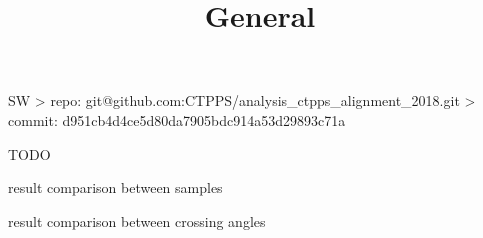 


\newpage %

\def\author{J.~Kašpar}
\def\caption{CTPPS alignment 2018}
\def\date{\the\year/\the\month/\the\day}

\let\NormalFonts\SetFontSizesX

\newpage %
\title{General}

\> SW
\>> repo: git@github.com:CTPPS/analysis\_ctpps\_alignment\_2018.git
\>> commit: d951cb4d4ce5d80da7905bdc914a53d29893c71a

\> TODO
\iffalse
\> input data
\>> alignment runs:\\ /eos/totem/data/ctpps/reconstruction/2017/alignment\_run\_September/version7
\>> physics runs:\\ /eos/totem/data/ctpps/reconstruction/2017/postTS2\_alignment\_data/version5
\>>> from Run2017E-17Nov2017-v1/AOD and Run2017F-17Nov2017-v1/AOD

\> re-reco performed with\\
/afs/cern.ch/work/j/jkaspar/software/ctpps/development/uniform\_pixel\_reco\_2017/CMSSW\_10\_2\_0
\>> pixel tracks only build with planes that did not change settings during the post-TS2 period
\>>> sector 45: used only planes 0, 2 and 4
\>>> sector 56: used only planes 0, 1 and 3
\fi


\newpage %

\centerline{}

\newpage %

\> result comparison between samples

\centerline{}

\newpage %

\> result comparison between crossing angles

\centerline{}



